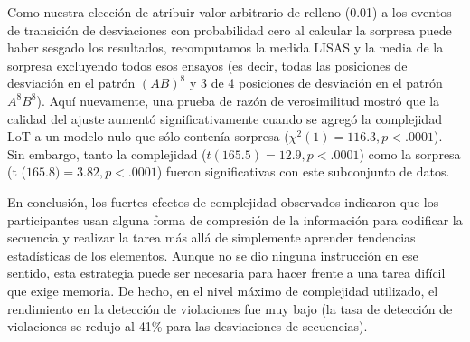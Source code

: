Como nuestra elección de atribuir valor arbitrario de relleno (0.01) a los eventos de transición de desviaciones con probabilidad cero al calcular la sorpresa puede haber sesgado los resultados, recomputamos la medida LISAS y la media de la sorpresa excluyendo todos esos ensayos (es decir, todas las posiciones de desviación en el patrón $(AB)^8$ y 3 de 4 posiciones de desviación en el patrón $A^8 B^8$). Aquí nuevamente, una prueba de razón de verosimilitud mostró que la calidad del ajuste aumentó significativamente cuando se agregó la complejidad LoT a un modelo nulo que sólo contenía sorpresa ($\chi^2(1) = 116.3, p < .0001$). Sin embargo, tanto la complejidad ($t (165.5) = 12.9, p < .0001$) como la sorpresa (t ($165.8) = 3.82, p < .0001$) fueron significativas con este subconjunto de datos. 


En conclusión, los fuertes efectos de complejidad observados indicaron que los participantes usan alguna forma de compresión de la información para codificar la secuencia y realizar la tarea más allá de simplemente aprender tendencias estadísticas de los elementos. Aunque no se dio ninguna instrucción en ese sentido, esta estrategia puede ser necesaria para hacer frente a una tarea difícil que exige memoria. De hecho, en el nivel máximo de complejidad utilizado, el rendimiento en la detección de violaciones fue muy bajo (la tasa de detección de violaciones se redujo al 41\% para las desviaciones de secuencias).


